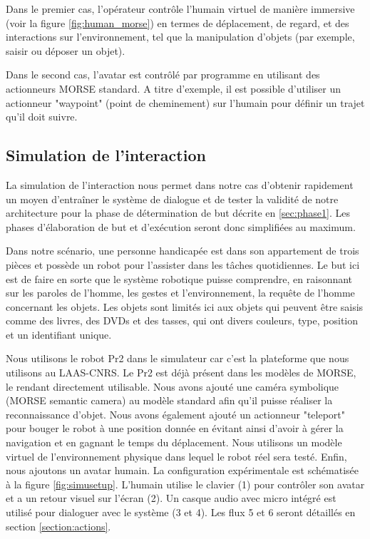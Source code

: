 \documentclass[a4paper,11pt,twoside]{StyleThese}
\begin{document}
Dans le premier cas, l'opérateur contrôle l'humain virtuel de manière immersive (voir la figure \ref{fig:human_morse}) en termes de déplacement, de regard, et des interactions sur l'environnement, tel que la manipulation d'objets (par exemple, saisir ou déposer un objet).

Dans le second cas, l'avatar est contrôlé par programme en utilisant des actionneurs MORSE standard. A titre d'exemple, il est possible d'utiliser un actionneur "waypoint" (point de cheminement) sur l'humain pour définir un trajet qu'il doit suivre.


\subsection{Simulation de l'interaction}

La simulation de l'interaction nous permet dans notre cas d'obtenir rapidement un moyen d'entraîner le système de dialogue et de tester la validité de notre architecture pour la phase de détermination de but décrite en \ref{sec:phase1}.
Les phases d'élaboration de but et d'exécution seront donc simplifiées au maximum.

Dans notre scénario, une personne handicapée est dans son appartement de trois pièces et possède un robot pour l'assister dans les tâches quotidiennes.
Le but ici est de faire en sorte que le système robotique puisse comprendre, en raisonnant sur les paroles de l'homme, les gestes et l'environnement, la requête de l'homme concernant les objets. Les objets sont limités ici aux objets qui peuvent être saisis comme des livres, des DVDs et des tasses, qui ont divers couleurs, type, position et un identifiant unique.

Nous utilisons le robot Pr2 dans le simulateur car c'est la plateforme que nous utilisons au LAAS-CNRS. Le Pr2 est déjà présent dans les modèles de MORSE, le rendant directement utilisable. Nous avons ajouté une caméra symbolique (MORSE semantic camera) au modèle standard afin qu'il puisse réaliser la reconnaissance d'objet. Nous avons également ajouté un actionneur "teleport" pour bouger le robot à une position donnée en évitant ainsi d'avoir à gérer la navigation et en gagnant le temps du déplacement. Nous utilisons un modèle virtuel de l'environnement physique dans lequel le robot réel sera testé. Enfin, nous ajoutons un avatar humain. La configuration expérimentale est schématisée à la figure \ref{fig:simusetup}. L'humain utilise le clavier (1) pour contrôler son avatar et a un retour visuel sur l'écran (2). Un casque audio avec micro intégré est utilisé pour dialoguer avec le système (3 et 4). Les flux 5 et 6 seront détaillés en section \ref{section:actions}. 
\end{document}
